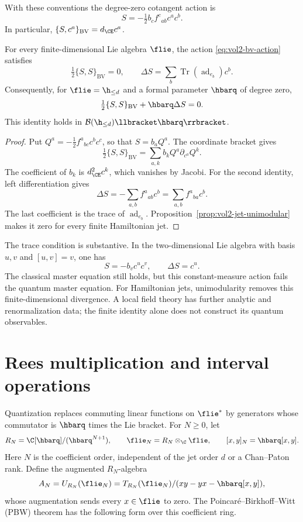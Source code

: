 With these conventions the degree-zero cotangent action is
\begin{equation}\label{eq:vol2-bv-action}
 S=-\tfrac12 b_c f^c{}_{ab}c^ac^b.
\end{equation}
In particular, $\{S,c^a\}_{\mathrm{BV}}=d_{\CE}c^a$.

\begin{theorem}\label{thm:vol2-finite-qme}
For every finite-dimensional Lie algebra $\flie$, the action
\eqref{eq:vol2-bv-action} satisfies
\[
 \tfrac12\{S,S\}_{\mathrm{BV}}=0,\qquad
 \Delta S=\sum_b\operatorname{Tr}(\operatorname{ad}_{e_b})c^b.
\]
Consequently, for $\flie=\h_{\leq d}$ and a formal parameter
$\hbarq$ of degree zero,
\[
 \tfrac12\{S,S\}_{\mathrm{BV}}+\hbarq\Delta S=0.
\]
This identity holds in $\mathcal B(\h_{\leq d})\llbracket\hbarq\rrbracket$.
\end{theorem}

\begin{proof}
Put $Q^a=-\tfrac12 f^a{}_{bc}c^bc^c$, so that $S=b_aQ^a$.
The coordinate bracket gives
\[
 \tfrac12\{S,S\}_{\mathrm{BV}}
 =\sum_{a,k}b_kQ^a\partial_{c^a}Q^k.
\]
The coefficient of $b_k$ is $d_{\CE}^2c^k$, which vanishes by
Jacobi. For the second identity, left differentiation gives
\[
 \Delta S=-\sum_{a,b}f^a{}_{ab}c^b
          =\sum_{a,b}f^a{}_{ba}c^b.
\]
The last coefficient is the trace of $\operatorname{ad}_{e_b}$.
Proposition~\ref{prop:vol2-jet-unimodular} makes it zero for every
finite Hamiltonian jet.
\end{proof}

The trace condition is substantive. In the two-dimensional Lie algebra
with basis $u,v$ and $[u,v]=v$, one has
\[
 S=-b_vc^uc^v,\qquad \Delta S=c^u.
\]
The classical master equation still holds, but this constant-measure
action fails the quantum master equation. For Hamiltonian jets,
unimodularity removes this finite-dimensional divergence.
A local field theory has further analytic and renormalization data;
the finite identity alone does not construct its quantum observables.

\section{Rees multiplication and interval operations}

Quantization replaces commuting linear functions on $\flie^*$ by
generators whose commutator is $\hbarq$ times the Lie bracket.
For $N\geq0$, let
\[
 R_N=\C[\hbarq]/(\hbarq^{N+1}),\qquad
 \flie_N=R_N\otimes_\C\flie,
 \qquad [x,y]_N=\hbarq[x,y].
\]
Here $N$ is the coefficient order, independent of the jet order $d$
or a Chan--Paton rank. Define the augmented $R_N$-algebra
\[
 A_N=U_{R_N}(\flie_N)
 =T_{R_N}(\flie_N)/(xy-yx-\hbarq[x,y]),
\]
whose augmentation sends every $x\in\flie$ to zero.
The Poincar\'e--Birkhoff--Witt (PBW) theorem has the following form
over this coefficient ring.

